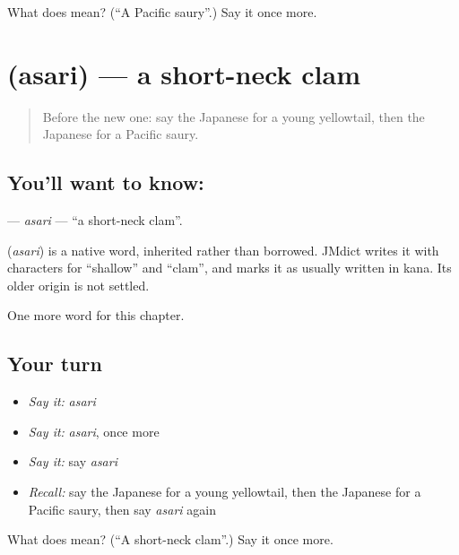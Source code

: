 \begin{tcolorbox}[breakable,colback=teal!4,colframe=teal!35!black,title={Before you move on}]
What does  mean? (\textquotedblleft{}A Pacific saury\textquotedblright{}.) Say it once more.
\end{tcolorbox}
\section[\texorpdfstring{\ja{あさり} (asari)}{あさり (asari)}]{ (asari) — a short-neck clam}

\label{lesson:JA-C116-asari}



\begin{quote}
Before the new one: say the Japanese for a young yellowtail, then the Japanese for a Pacific saury.
\end{quote}

\subsection*{You'll want to know: }
\textbf{} — \emph{asari} — \textquotedblleft{}a short-neck clam\textquotedblright{}.

\begin{cousinweb}
\textbf{} (\emph{asari}) is a native word, inherited rather than borrowed. JMdict writes it with characters for \textquotedblleft{}shallow\textquotedblright{} and \textquotedblleft{}clam\textquotedblright{}, and marks it as usually written in kana. Its older origin is not settled.
\end{cousinweb}

\begin{grammarlens}[title={What you've built}]
One more word for this chapter.
\end{grammarlens}

\subsection*{Your turn}
\begin{itemize}
\raggedright
  \item \emph{Say it:} \emph{asari}
  \item \emph{Say it:} \emph{asari}, once more
  \item \emph{Say it:} say \emph{asari}
  \item \emph{Recall:} say the Japanese for a young yellowtail, then the Japanese for a Pacific saury, then say \emph{asari} again
\end{itemize}

\begin{tcolorbox}[breakable,colback=teal!4,colframe=teal!35!black,title={Before you move on}]
What does  mean? (\textquotedblleft{}A short-neck clam\textquotedblright{}.) Say it once more.
\end{tcolorbox}
